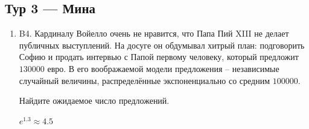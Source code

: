 \documentclass[12pt]{article}
\newenvironment{problem}{}{}
\newenvironment{sol}{}{} %
\begin{document}
\newpage
\subsection{Тур 3 — Мина}

\begin{enumerate}
\begin{problem}
\item[B4.] Кардиналу Войелло очень не нравится, что Папа Пий XIII не делает публичных выступлений. На досуге он обдумывал хитрый план: подговорить Софию и продать интервью с Папой первому человеку, который предложит $130000$ евро. В его воображаемой модели предложения – независимые случайный величины, распределённые экспоненциально со средним $100000$.

Найдите ожидаемое число предложений.

\begin{sol}
$e^{1.3} \approx 4.5$
\end{sol}
\end{problem}
\end{enumerate}
\end{document}
